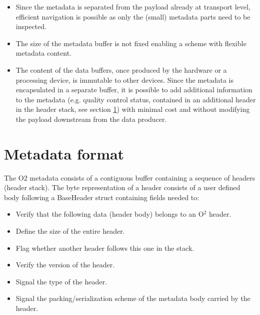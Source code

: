 \documentclass[a4paper,twoside]{article}
\def\O2{O$^2$}
\begin{document}
\begin{itemize}
  \item Since the metadata is separated from the payload already at transport level, efficient navigation is possible as only the (small) metadata parts need to be inspected.
  \item The size of the metadata buffer is not fixed enabling a scheme with flexible metadata content.
  \item The content of the data buffers, once produced by the hardware or a processing device, is immutable to other devices. Since the metadata is encapsulated in a separate buffer, it is possible to add additional information to the metadata (e.g. quality control status, contained in an additional header in the header stack, see section \ref{sec:header}) with minimal cost and without modifying the payload downstream from the data producer.
\end{itemize}

\section{Metadata format}\label{sec:header}

The O2 metadata consists of a contiguous buffer containing a sequence of headers (header stack).
The byte representation of a header consists of a user defined body following a BaseHeader struct containing fields needed to:
\begin{itemize}
  \item Verify that the following data (header body) belongs to an \O2 header.
  \item Define the size of the entire header.
  \item Flag whether another header follows this one in the stack.
  \item Verify the version of the header.
  \item Signal the type of the header.
  \item Signal the packing/serialization scheme of the metadata body carried by the header.
\end{itemize}
\end{document}

